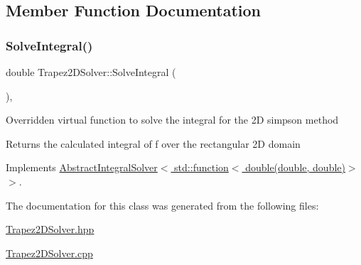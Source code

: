 \subsection{Member Function Documentation}
\mbox{\label{class_trapez2_d_solver_a88f724ff6fd2c566d54f5d0ccc500cb9}} 
\subsubsection{\texorpdfstring{Solve\+Integral()}{SolveIntegral()}}
{\footnotesize\ttfamily double Trapez2\+D\+Solver\+::\+Solve\+Integral (\begin{DoxyParamCaption}{ }\end{DoxyParamCaption})\hspace{0.3cm}{\ttfamily [override]}, {\ttfamily [virtual]}}

Overridden virtual function to solve the integral for the 2D simpson method \begin{DoxyReturn}{Returns}
the calculated integral of f over the rectangular 2D domain 
\end{DoxyReturn}


Implements \hyperlink{class_abstract_integral_solver_ad87cb44c5ef3122bc95be48f473ba399}{Abstract\+Integral\+Solver$<$ std\+::function$<$ double(double, double)$>$ $>$}.



The documentation for this class was generated from the following files\+:\begin{DoxyCompactItemize}
\item 
\hyperlink{_trapez2_d_solver_8hpp}{Trapez2\+D\+Solver.\+hpp}\item 
\hyperlink{_trapez2_d_solver_8cpp}{Trapez2\+D\+Solver.\+cpp}\end{DoxyCompactItemize}
